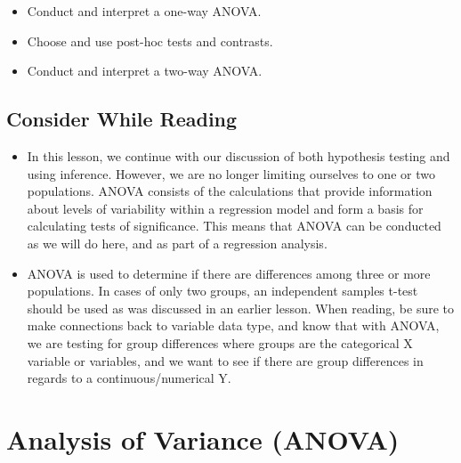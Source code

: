 \documentclass[
  letterpaper,
  DIV=11,
  numbers=noendperiod]{scrreprt}
\providecommand{\tightlist}{%
  \setlength{\itemsep}{0pt}\setlength{\parskip}{0pt}}\usepackage{longtable,booktabs,array}
\begin{document}
\begin{itemize}
\tightlist
\item
  Conduct and interpret a one-way ANOVA.
\item
  Choose and use post-hoc tests and contrasts.
\item
  Conduct and interpret a two-way ANOVA.
\end{itemize}

\section{Consider While Reading}\label{consider-while-reading-7}

\begin{itemize}
\tightlist
\item
  In this lesson, we continue with our discussion of both hypothesis
  testing and using inference. However, we are no longer limiting
  ourselves to one or two populations. ANOVA consists of the
  calculations that provide information about levels of variability
  within a regression model and form a basis for calculating tests of
  significance. This means that ANOVA can be conducted as we will do
  here, and as part of a regression analysis.
\item
  ANOVA is used to determine if there are differences among three or
  more populations. In cases of only two groups, an independent samples
  t-test should be used as was discussed in an earlier lesson. When
  reading, be sure to make connections back to variable data type, and
  know that with ANOVA, we are testing for group differences where
  groups are the categorical X variable or variables, and we want to see
  if there are group differences in regards to a continuous/numerical Y.
\end{itemize}


\chapter{Analysis of Variance
(ANOVA)}\label{analysis-of-variance-anova-1}
\end{document}
